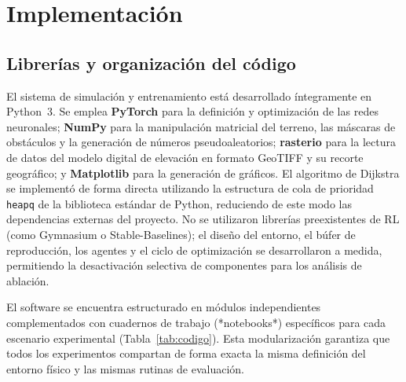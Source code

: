 \section{Implementación}
\label{sec:impl}

\subsection{Librerías y organización del código}
El sistema de simulación y entrenamiento está desarrollado íntegramente en Python~3. Se emplea \textbf{PyTorch} para la definición y optimización de las redes neuronales; \textbf{NumPy} para la manipulación matricial del terreno, las máscaras de obstáculos y la generación de números pseudoaleatorios; \textbf{rasterio} para la lectura de datos del modelo digital de elevación en formato GeoTIFF y su recorte geográfico; y \textbf{Matplotlib} para la generación de gráficos. El algoritmo de Dijkstra se implementó de forma directa utilizando la estructura de cola de prioridad \texttt{heapq} de la biblioteca estándar de Python, reduciendo de este modo las dependencias externas del proyecto. No se utilizaron librerías preexistentes de RL (como Gymnasium o Stable-Baselines); el diseño del entorno, el búfer de reproducción, los agentes y el ciclo de optimización se desarrollaron a medida, permitiendo la desactivación selectiva de componentes para los análisis de ablación.

El software se encuentra estructurado en módulos independientes complementados con cuadernos de trabajo (*notebooks*) específicos para cada escenario experimental (Tabla~\ref{tab:codigo}). Esta modularización garantiza que todos los experimentos compartan de forma exacta la misma definición del entorno físico y las mismas rutinas de evaluación.

